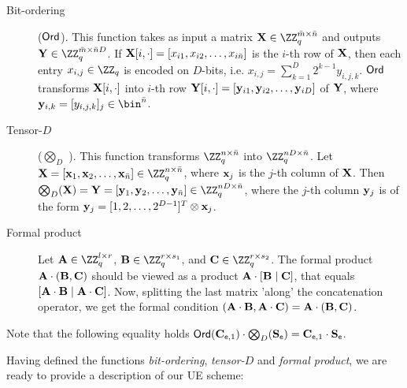\documentclass{fundam}
\begin{document}
\begin{description}
	
	\item[{Bit-ordering}] {($\mathsf{Ord}$)}. This function takes as input a matrix $\vr{X}\in \ZZ_{q}^{\bar{m}\times \bar{n}}$ and outputs $\vr{Y}\in \ZZ_{q}^{\bar{m}\times \bar{n}D}$. If $\mathbf{X}[i,\cdot]=[{x}_{i1}, {x}_{i2}, \ldots , {x}_{i\bar{n}}]$ is the $i$-th row of $\mathbf{X}$, then each entry ${x}_{i,j}\in\ZZ_{q}$ is encoded on $D$-bits, i.e. ${x}_{i,j}=\sum_{k=1}^{D}2^{k-1}y_{i,j,k}$. $\mathsf{Ord}$ transforms $\mathbf{X}[i,\cdot]$ into $i$-th row $\mathbf{Y}[i,\cdot]=[\mathbf{y}_{i1}, \mathbf{y}_{i2}, \ldots , \mathbf{y}_{iD}]$ of $\mathbf{Y}$, where $\vr{y}_{i,k}=[y_{i,j,k}]_{j}\in\bin^{\bar{n}}$.
	
	\item[Tensor-$D$] ($\bigotimes_{D}$  ). This function transforms $\ZZ_{q}^{n\times \bar{n}}$ into $\ZZ_{q}^{nD\times \bar{n}}$. Let $\vr{X} =[\vr{x}_{1}, \vr{x}_{2}, \ldots , \vr{x}_{\bar{n}}]\in \ZZ_{q}^{n\times \bar{n}}$, where $\mathbf{x}_{j}$ is the $j$-th column of $\mathbf{X}$. Then $\bigotimes_{D}(\vr{X}) = \vr{Y}=[\vr{y}_{1}, \vr{y}_{2}, \ldots , \vr{y}_{\bar{n}}]\in \ZZ_{q}^{nD\times \bar{n}}$, where the $j$-th column $\mathbf{y}_{j}$ is of the form $\mathbf{y}_{j}=[1, 2, \ldots , 2^{D-1}]^{T}\otimes \mathbf{x}_{j}$.
	
	\item[Formal product] Let $\vr{A}\in\ZZ_{q}^{l\times r}$, $\vr{B}\in\ZZ_{q}^{r\times s_{1}}$, and $\vr{C}\in\ZZ_{q}^{r\times s_{2}}$. The formal product $\mathbf{A}\cdot (\mathbf{B},\mathbf{C})$ should be viewed as a product $\mathbf{A}\cdot [\mathbf{B}\mid \mathbf{C}]$, that equals $[\mathbf{A}\cdot \mathbf{B}\mid \mathbf{A}\cdot \mathbf{C}]$. Now, splitting the last matrix 'along' the concatenation operator, we get the formal condition $(\mathbf{A}\cdot \mathbf{B},  \mathbf{A}\cdot \mathbf{C}) = \mathbf{A}\cdot (\mathbf{B},\mathbf{C})$. 
\end{description}

\begin{remark}
Note that the following equality holds
$\mathsf{Ord}(\mathbf{C}_{\mathsf{e} , 1})\cdot \bigotimes_{D} (\mathbf{S}_{\mathsf{e}}) = \mathbf{C}_{\mathsf{e} , 1}\cdot \mathbf{S}_{\mathsf{e}}$.
\end{remark}	


Having defined the functions \textit{bit-ordering}, \textit{tensor-$D$} and \textit{formal product}, we are ready to provide a description of our UE scheme:
\end{document}

